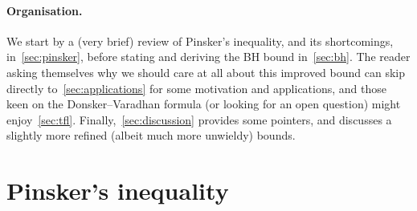 \documentclass[10pt]{article}
\begin{document}
\paragraph{Organisation.}
We start by a (very brief) review of Pinsker's inequality, and its shortcomings, in~\autoref{sec:pinsker}, before stating and deriving the BH bound in~\autoref{sec:bh}. The reader asking themselves why we should care at all about this improved bound can skip directly to~\autoref{sec:applications} for some motivation and applications, and those keen on the Donsker--Varadhan formula (or looking for an open question) might enjoy~\autoref{sec:tfl}. Finally,~\autoref{sec:discussion} provides some pointers, and discusses a slightly more refined (albeit much more unwieldy) bounds.

\section{Pinsker's inequality}
  \label{sec:pinsker}
  
\end{document}
